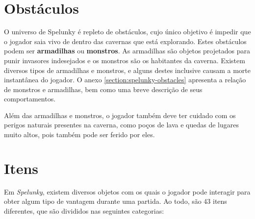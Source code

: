 \section{\label{section:spelunky-obstacles}Obstáculos}
O universo de Spelunky é repleto de obstáculos, cujo único objetivo é impedir
que o jogador saia vivo de dentro das cavernas que está explorando. Estes
obstáculos podem ser \textbf{armadilhas} ou \textbf{monstros}. As armadilhas
são objetos projetados para punir invasores indesejados e os monstros são os
habitantes da caverna. Existem diversos tipos de armadilhas e monstros, e
alguns destes inclusive causam a morte instantânea do jogador. O anexo
\ref{section:spelunky-obstacles} apresenta a relação de monstros e
armadilhas, bem como uma breve descrição de seus comportamentos.

Além das armadilhas e monstros, o jogador também deve ter cuidado com os perigos
naturais presentes na caverna, como poços de lava e quedas de lugares muito
altos, pois também pode ser ferido por eles.


\section{\label{section:spelunky-items}Itens}
Em \textit{Spelunky}, existem diversos objetos com os quais o jogador pode
interagir para obter algum tipo de vantagem durante uma partida. Ao todo, são 43
itens diferentes, que são divididos nas seguintes categorias:

